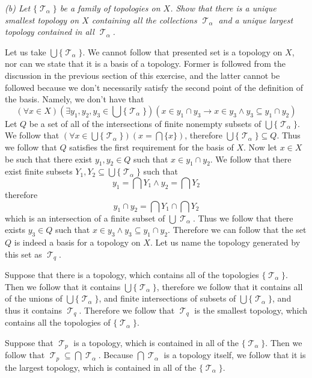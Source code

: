 \documentclass[11pt,oneside,titlepage]{book}
\DeclareMathOperator \topol {\mathcal {T}}
\newcommand{\set}[1]{\{ #1 \}}
\begin{document}
\textit{(b) Let $\set{\topol_\alpha}$ be a family of topologies on $X$. Show that there is a
  unique smallest topology on $X$ containing all the collections $\topol_\alpha$ and
  a unique largest topology contained in all $\topol_\alpha$.}

Let us take $\bigcup{\set{\topol_\alpha}}$. We cannot follow that presented
set is a topology on $X$, nor can we state that it is a basis of a topology. Former
is followed from the discussion in the previous section of this exercise, and the latter
cannot be followed because we don't necessarily satisfy the
second point of the definition of the basis. Namely, we don't have that
$$(\forall x \in X)(\exists y_1, y_2, y_3 \in \bigcup{\set{\topol_\alpha}})(x \in y_1 \cap y_3 \to
x \in y_3 \land y_3 \subseteq y_1 \cap y_2)$$
Let $Q$ be a set of all of the intersections of finite nonempty subsets of
$\bigcup{\set{\topol_\alpha}}$. We follow that $(\forall x \in \bigcup{\set{\topol_\alpha}})
(x = \bigcap{\{x\}})$, therefore $\bigcup{\set{\topol_\alpha}} \subseteq Q$. 
Thus we follow that $Q$ satisfies
the first requirement for the basis of $X$. Now let $x \in X$ be such that there
exist $y_1, y_2 \in Q$ such that $x \in y_1 \cap y_2$. We follow that there exist
finite subsets $Y_1, Y_2 \subseteq \bigcup{\set{\topol_\alpha}}$ such that 
$$y_1 = \bigcap{Y_1} \land y_2 = \bigcap{Y_2}$$
therefore
$$y_1 \cap y_2  = \bigcap{Y_1} \cap \bigcap{Y_2}$$
which is an intersection of a finite subset of $\bigcup{\topol_\alpha}$. Thus we follow that there
exists $y_3 \in Q$ such that $x \in y_3 \land y_3 \subseteq y_1 \cap y_2$. 
Therefore we can follow that the set $Q$ is indeed a basis for a topology on $X$.
Let us name the topology generated by this set as $\topol_q$.

Suppose that there is a topology, which contains
all of the topologies $\set{\topol_\alpha}$. Then we follow that it contains
$\bigcup{\set{\topol_\alpha}}$, therefore we follow that it contains all of the unions
of $\bigcup{\set{\topol_\alpha}}$, and finite intersections of subsets of
$\bigcup{\set{\topol_\alpha}}$, and thus it contains $\topol_q$. Therefore
we follow that $\topol_q$ is the smallest topology, which contains all
the topologies of $\set{\topol_\alpha}$.

Suppose that $\topol_p$ is a topology, which is contained in all of the $\set{\topol_\alpha}$.
Then we follow that $\topol_p \subseteq \bigcap{\topol_\alpha}$. Because $\bigcap{\topol_\alpha}$
is a topology itself, we follow that it is the largest topology, which is contained
in all of the $\set{\topol_\alpha}$.
\end{document}

